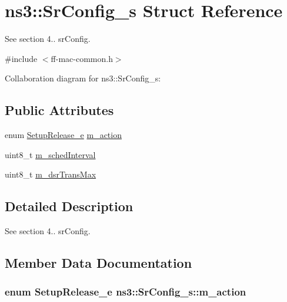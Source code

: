 \hypertarget{structns3_1_1SrConfig__s}{}\section{ns3\+:\+:Sr\+Config\+\_\+s Struct Reference}
\label{structns3_1_1SrConfig__s}


See section 4.. sr\+Config.  




{\ttfamily \#include $<$ff-\/mac-\/common.\+h$>$}



Collaboration diagram for ns3\+:\+:Sr\+Config\+\_\+s\+:
\subsection*{Public Attributes}
\begin{DoxyCompactItemize}
\item 
enum \hyperlink{namespacens3_a19c98a2a7ba2ba8173e4b7ed3c0cef08}{Setup\+Release\+\_\+e} \hyperlink{structns3_1_1SrConfig__s_a5e918c86e3f91eef71a3957c786e23f5}{m\+\_\+action}
\item 
uint8\+\_\+t \hyperlink{structns3_1_1SrConfig__s_ac62406789ffe8a4ea8fb62bce3ee2143}{m\+\_\+sched\+Interval}
\item 
uint8\+\_\+t \hyperlink{structns3_1_1SrConfig__s_a2f13842a83158b691417153c94c18e97}{m\+\_\+dsr\+Trans\+Max}
\end{DoxyCompactItemize}


\subsection{Detailed Description}
See section 4.. sr\+Config. 

\subsection{Member Data Documentation}
\subsubsection[{\texorpdfstring{m\+\_\+action}{m_action}}]{\setlength{\rightskip}{0pt plus 5cm}enum {\bf Setup\+Release\+\_\+e} ns3\+::\+Sr\+Config\+\_\+s\+::m\+\_\+action}\hypertarget{structns3_1_1SrConfig__s_a5e918c86e3f91eef71a3957c786e23f5}{}\label{structns3_1_1SrConfig__s_a5e918c86e3f91eef71a3957c786e23f5}
